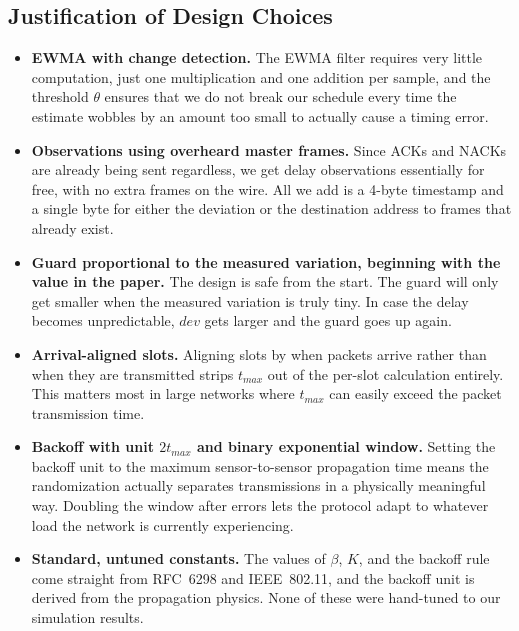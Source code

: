 \documentclass{article}
\begin{document}
\subsection{Justification of Design Choices} \label{sec:justification}
\begin{itemize}
    \item \textbf{EWMA with change detection.} The EWMA filter requires very little computation, just one multiplication and one addition per sample, and the threshold $\theta$ ensures that we do not break our schedule every time the estimate wobbles by an amount too small to actually cause a timing error.
    \item \textbf{Observations using overheard master frames.} Since ACKs and NACKs are already being sent regardless, we get delay observations essentially for free, with no extra frames on the wire. All we add is a 4-byte timestamp and a single byte for either the deviation or the destination address to frames that already exist.
    \item \textbf{Guard proportional to the measured variation, beginning with the value in the paper.} The design is safe from the start. The guard will only get smaller when the measured variation is truly tiny. In case the delay becomes unpredictable, $dev$ gets larger and the guard goes up again.
    \item \textbf{Arrival-aligned slots.} Aligning slots by when packets arrive rather than when they are transmitted strips $t_{max}$ out of the per-slot calculation entirely. This matters most in large networks where $t_{max}$ can easily exceed the packet transmission time.
    \item \textbf{Backoff with unit $2t_{max}$ and binary exponential window.} Setting the backoff unit to the maximum sensor-to-sensor propagation time means the randomization actually separates transmissions in a physically meaningful way. Doubling the window after errors lets the protocol adapt to whatever load the network is currently experiencing.
    \item \textbf{Standard, untuned constants.} The values of $\beta$, $K$, and the backoff rule come straight from RFC~6298 and IEEE~802.11, and the backoff unit is derived from the propagation physics. None of these were hand-tuned to our simulation results.
\end{itemize}

\end{document}
